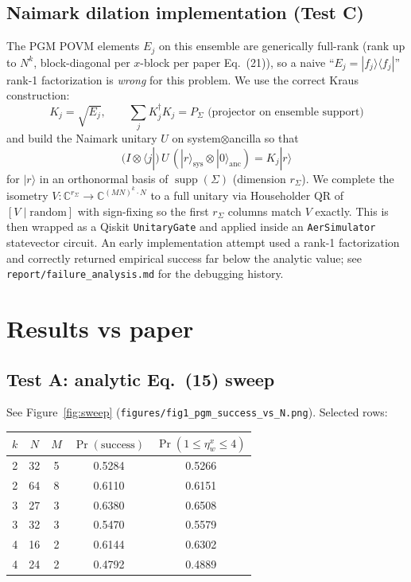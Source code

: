 \documentclass[11pt]{article}
\begin{document}
\subsection{Naimark dilation implementation (Test C)}

The PGM POVM elements $E_j$ on this ensemble are generically full-rank
(rank up to $N^k$, block-diagonal per $x$-block per paper Eq.~(21)), so
a naive ``$E_j=|f_j\rangle\langle f_j|$'' rank-1 factorization is
\emph{wrong} for this problem. We use the correct
Kraus construction:
\[
  K_j=\sqrt{E_j},\qquad \sum_j K_j^\dagger K_j = P_\Sigma \text{ (projector on ensemble support)}
\]
and build the Naimark unitary $U$ on system$\otimes$ancilla so that
\[
  (I\otimes\langle j|)\,U\,(|r\rangle_{\mathrm{sys}}\otimes|0\rangle_{\mathrm{anc}})
  = K_j |r\rangle
\]
for $|r\rangle$ in an orthonormal basis of $\operatorname{supp}(\Sigma)$
(dimension $r_\Sigma$). We complete the isometry $V:\mathbb{C}^{r_\Sigma}
\to\mathbb{C}^{(MN)^k\cdot N}$ to a full unitary via Householder QR of
$[V\mid\text{random}]$ with sign-fixing so the first $r_\Sigma$ columns
match $V$ exactly. This is then wrapped as a Qiskit
\verb|UnitaryGate| and applied inside an \verb|AerSimulator|
statevector circuit. An early implementation attempt used a
rank-1 factorization and correctly returned empirical success far
below the analytic value; see \verb|report/failure_analysis.md| for the
debugging history.

\section{Results vs paper}
\label{sec:results}

\subsection{Test A: analytic Eq.~(15) sweep}
See Figure~\ref{fig:sweep} (\verb|figures/fig1_pgm_success_vs_N.png|). Selected rows:
\begin{center}
\small
\begin{tabular}{ccccc}\toprule
$k$ & $N$ & $M$ & $\Pr(\text{success})$ & $\Pr(1\le\eta_w^x\le 4)$ \\ \midrule
2 & 32 & 5 & 0.5284 & 0.5266 \\
2 & 64 & 8 & 0.6110 & 0.6151 \\
3 & 27 & 3 & 0.6380 & 0.6508 \\
3 & 32 & 3 & 0.5470 & 0.5579 \\
4 & 16 & 2 & 0.6144 & 0.6302 \\
4 & 24 & 2 & 0.4792 & 0.4889 \\
\bottomrule
\end{tabular}
\end{center}
\end{document}
